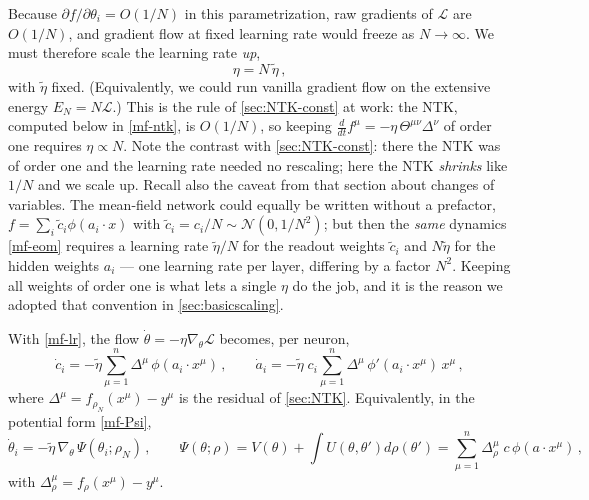 \documentclass[11pt]{article}
\newcommand{\CN}{{\mathcal N}}
\newcommand{\CL}{{\mathcal L}}
\newcommand{\pd}{\partial}
\begin{document}
Because $\pd f/\pd \theta_i = O(1/N)$ in this parametrization, raw gradients of $\CL$ are $O(1/N)$, and gradient flow at fixed learning rate would freeze as $N\to\infty$. We must therefore scale the learning rate \emph{up},
%
\begin{equation} \label{mf-lr}
    \eta = N\,\tilde\eta\,,
\end{equation}
%
with $\tilde\eta$ fixed. (Equivalently, we could run vanilla gradient flow on the extensive energy $E_N=N\CL$.) This is the rule of \cref{sec:NTK-const} at work: the NTK, computed below in \eqref{mf-ntk}, is $O(1/N)$, so keeping $\frac{d}{dt}f^\mu = -\eta\,\Theta^{\mu\nu}\Delta^\nu$ of order one requires $\eta\propto N$. Note the contrast with \cref{sec:NTK-const}: there the NTK was of order one and the learning rate needed no rescaling; here the NTK \emph{shrinks} like $1/N$ and we scale up. Recall also the caveat from that section about changes of variables. The mean-field network could equally be written without a prefactor, $f = \sum_i\tilde c_i\phi(a_i\cdot x)$ with $\tilde c_i = c_i/N\sim\CN(0,1/N^2)$; but then the \emph{same} dynamics \eqref{mf-eom} requires a learning rate $\tilde\eta/N$ for the readout weights $\tilde c_i$ and $N\tilde\eta$ for the hidden weights $a_i$ --- one learning rate per layer, differing by a factor $N^2$. Keeping all weights of order one is what lets a single $\eta$ do the job, and it is the reason we adopted that convention in \cref{sec:basicscaling}.

With \eqref{mf-lr}, the flow $\dot\theta = -\eta\nabla_\theta\CL$ becomes, per neuron,
%
\begin{equation} \label{mf-eom}
    \dot c_i = -\tilde\eta \sum_{\mu=1}^n \Delta^\mu\, \phi(a_i\cdot x^\mu)\,,\qquad
    \dot a_i = -\tilde\eta\; c_i \sum_{\mu=1}^n \Delta^\mu\, \phi'(a_i\cdot x^\mu)\, x^\mu\,,
\end{equation}
%
where $\Delta^\mu = f_{\rho_N}(x^\mu)-y^\mu$ is the residual of \cref{sec:NTK}. Equivalently, in the potential form \eqref{mf-Psi},
%
\begin{equation} \label{mf-eom-Psi}
    \dot\theta_i = -\tilde\eta\,\nabla_\theta\, \Psi(\theta_i;\rho_N)\,,
    \qquad
    \Psi(\theta;\rho) = V(\theta)+\int U(\theta,\theta')d\rho(\theta') = \sum_{\mu=1}^n \Delta^\mu_\rho \; c\,\phi(a\cdot x^\mu)\,,
\end{equation}
%
with $\Delta_\rho^\mu = f_\rho(x^\mu)-y^\mu$.
\end{document}
